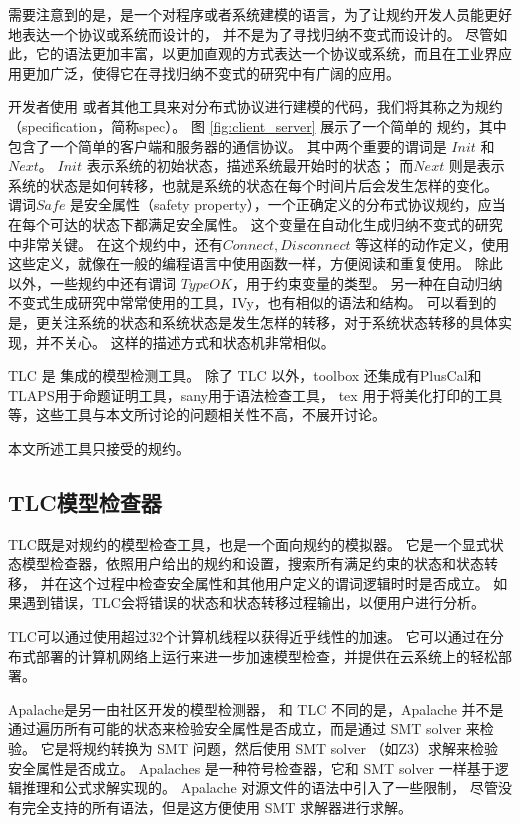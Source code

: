 需要注意到的是，\TLA 是一个对程序或者系统建模的语言，为了让规约开发人员能更好地表达一个协议或系统而设计的，
并不是为了寻找归纳不变式而设计的。
尽管如此，它的语法更加丰富，以更加直观的方式表达一个协议或系统，而且在工业界应用更加广泛，使得它在寻找归纳不变式的研究中有广阔的应用。

开发者使用 \TLA 或者其他工具来对分布式协议进行建模的代码，我们将其称之为规约（specification，简称spec）。
图 \ref{fig:client_server} 展示了一个简单的 \TLA 规约，其中包含了一个简单的客户端和服务器的通信协议。
其中两个重要的谓词是 $Init$ 和 $Next$。
$Init$ 表示系统的初始状态，描述系统最开始时的状态；
而$Next$ 则是表示系统的状态是如何转移，也就是系统的状态在每个时间片后会发生怎样的变化。
谓词$Safe$ 是安全属性（safety property），一个正确定义的分布式协议规约，应当在每个可达的状态下都满足安全属性。
这个变量在自动化生成归纳不变式的研究中非常关键。
在这个规约中，还有$Connect, Disconnect$ 等这样的动作定义，使用这些定义，就像在一般的编程语言中使用函数一样，方便阅读和重复使用。
除此以外，一些规约中还有谓词 $TypeOK$，用于约束变量的类型。
另一种在自动归纳不变式生成研究中常常使用的工具，IVy，也有相似的语法和结构。
可以看到的是，\TLA 更关注系统的状态和系统状态是发生怎样的转移，对于系统状态转移的具体实现，\TLA 并不关心。
这样的描述方式和状态机非常相似。

TLC 是 \TLA 集成的模型检测工具。
除了 TLC 以外，\TLA toolbox\cite{tla+toolbox} 还集成有PlusCal\cite{PlusCal}和TLAPS用于命题证明工具，sany用于语法检查工具，
tex 用于将\TLA 美化打印的工具等，这些工具与本文所讨论的问题相关性不高，不展开讨论。

本文所述工具只接受\TLA 的规约。

\subsection{TLC模型检查器}\label{sec:tlc-apalache}
TLC既是对\TLA 规约的模型检查工具，也是一个面向规约的模拟器。
它是一个显式状态模型检查器，依照用户给出的规约和设置，搜索所有满足约束的状态和状态转移，
并在这个过程中检查安全属性和其他用户定义的谓词逻辑时时是否成立。
如果遇到错误，TLC会将错误的状态和状态转移过程输出，以便用户进行分析。

TLC可以通过使用超过32个计算机线程以获得近乎线性的加速。
它可以通过在分布式部署的计算机网络上运行来进一步加速模型检查，并提供在云系统上的轻松部署。

Apalache\cite{apalache1, apalache2}是另一由社区开发的模型检测器， 和 TLC 不同的是，Apalache 并不是通过遍历所有可能的状态来检验安全属性是否成立，而是通过 SMT solver 来检验。
它是将\TLA 规约转换为 SMT 问题，然后使用 SMT solver （如Z3\cite{z3}）求解来检验安全属性是否成立。
Apalaches 是一种符号检查器，它和 SMT solver 一样基于逻辑推理和公式求解实现的。
Apalache 对\TLA 源文件的语法中引入了一些限制，
尽管没有完全支持\TLA 的所有语法，但是这方便使用 SMT 求解器进行求解。

